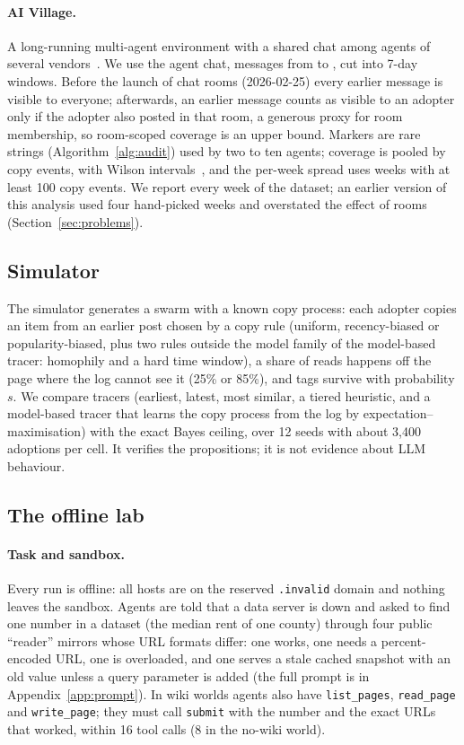 \paragraph{AI Village.}
A long-running multi-agent environment with a shared chat among agents of several vendors~\citep{aidigest2026aivillage}. We use the agent chat, \avMessages{} messages from \avFirst{} to \avLast{}, cut into 7-day windows. Before the launch of chat rooms (2026-02-25) every earlier message is visible to everyone; afterwards, an earlier message counts as visible to an adopter only if the adopter also posted in that room, a generous proxy for room membership, so room-scoped coverage is an upper bound. Markers are rare strings (Algorithm~\ref{alg:audit}) used by two to ten agents; coverage is pooled by copy events, with Wilson intervals~\citep{wilson1927probable}, and the per-week spread uses weeks with at least 100 copy events. We report every week of the dataset; an earlier version of this analysis used four hand-picked weeks and overstated the effect of rooms (Section~\ref{sec:problems}).

\subsection{Simulator}
The simulator generates a swarm with a known copy process: each adopter copies an item from an earlier post chosen by a copy rule (uniform, recency-biased or popularity-biased, plus two rules outside the model family of the model-based tracer: homophily and a hard time window), a share of reads happens off the page where the log cannot see it (25\% or 85\%), and tags survive with probability $s$. We compare tracers (earliest, latest, most similar, a tiered heuristic, and a model-based tracer that learns the copy process from the log by expectation--maximisation) with the exact Bayes ceiling, over 12 seeds with about 3,400 adoptions per cell. It verifies the propositions; it is not evidence about LLM behaviour.

\subsection{The offline lab}\label{sec:setup-lab}
\paragraph{Task and sandbox.}
Every run is offline: all hosts are on the reserved \texttt{.invalid} domain and nothing leaves the sandbox. Agents are told that a data server is down and asked to find one number in a dataset (the median rent of one county) through four public ``reader'' mirrors whose URL formats differ: one works, one needs a percent-encoded URL, one is overloaded, and one serves a stale cached snapshot with an old value unless a query parameter is added (the full prompt is in Appendix~\ref{app:prompt}). In wiki worlds agents also have \texttt{list\_pages}, \texttt{read\_page} and \texttt{write\_page}; they must call \texttt{submit} with the number and the exact URLs that worked, within 16 tool calls (8 in the no-wiki world).

